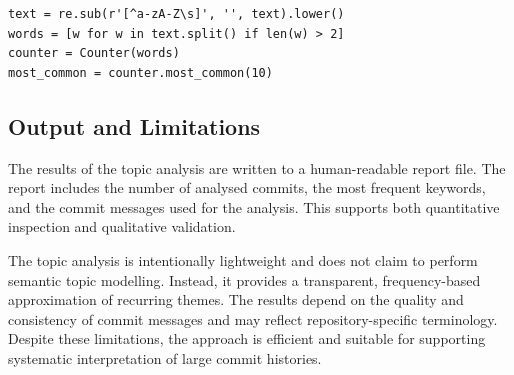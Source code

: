 \begin{lstlisting}[style=mypicturestyle, caption={Keyword frequency analysis over selected commit messages}, label={lst:keywords}]
text = re.sub(r'[^a-zA-Z\s]', '', text).lower()
words = [w for w in text.split() if len(w) > 2]
counter = Counter(words)
most_common = counter.most_common(10)
\end{lstlisting}

\subsection{Output and Limitations}

The results of the topic analysis are written to a human-readable report file. The report includes the number of analysed commits, the most frequent keywords, and the commit messages used for the analysis. This supports both quantitative inspection and qualitative validation.

The topic analysis is intentionally lightweight and does not claim to perform semantic topic modelling. Instead, it provides a transparent, frequency-based approximation of recurring themes. The results depend on the quality and consistency of commit messages and may reflect repository-specific terminology. Despite these limitations, the approach is efficient and suitable for supporting systematic interpretation of large commit histories.
